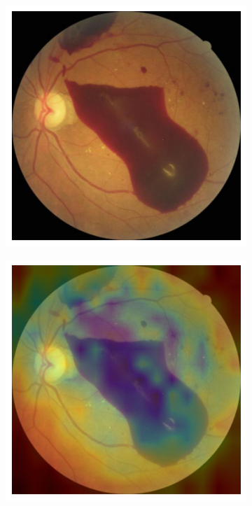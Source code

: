 \documentclass[twocolumn, fontsize=10pt]{article}
\begin{document}
\begin{appendices}
\begin{figure}[H]
    \centering
    \begin{subfigure}[b]{0.2\textwidth}
        \raggedleft
        \includegraphics[width=\textwidth]{image-1.png}
    \end{subfigure}
    \hspace{5mm}
    \begin{subfigure}[b]{0.2\textwidth}
        \centering
        \includegraphics[width=\textwidth]{cbam-heatmap-1.png}

\end{subfigure}
\end{figure}
\end{appendices}
\end{document}
